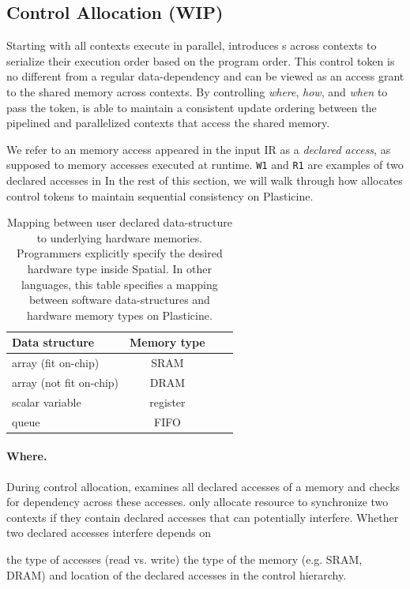 \subsection{Control Allocation (WIP)} 
\label{sec:sync}
Starting with all contexts execute in parallel, \name introduces s across contexts
to serialize their execution order based on the program order.
This control token is no different from a regular data-dependency and can be viewed as 
an access grant to the shared memory across contexts. 
By controlling {\em where}, {\em how}, and {\em when} to pass the token, \name is able to maintain a consistent update ordering between the pipelined and parallelized contexts that access the shared memory.

We refer to an memory access appeared in the input IR as a \emph{declared access}, as supposed to
memory accesses executed at runtime.
\texttt{W1} and \texttt{R1} are examples of two declared accesses in 
In the rest of this section, we will walk through how \name allocates control tokens
to maintain sequential consistency on Plasticine.

\begin{table}
  \centering
\begin{tabular}{lccc}
  \toprule
 Data structure & Memory type \\ \midrule
  array (fit on-chip) & SRAM \\
  array (not fit on-chip) & DRAM \\
  scalar variable & register \\
  queue & FIFO \\
 \bottomrule
\end{tabular}
\caption[Mapping between data-structure to hardware memories]{
  Mapping between user declared data-structure to underlying hardware memories. 
  Programmers explicitly specify the desired hardware type inside Spatial. 
  In other languages, this table specifies a mapping between software data-structures 
  and hardware memory types on Plasticine.
}
\label{tab:memtype}
\end{table}

\paragraph{Where.}
During control allocation, \name examines all declared accesses of a memory and checks for dependency across these accesses.
\name only allocate resource to synchronize two contexts if they contain declared accesses that can potentially interfere.
Whether two declared accesses interfere depends on 
\begin{outline}
  \1 the type of accesses (read vs. write)
  \1 the type of the memory (e.g. SRAM, DRAM)
  \1 and location of the declared accesses in the control hierarchy.
\end{outline}

